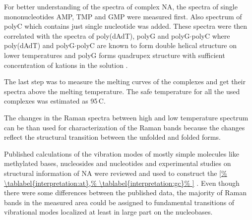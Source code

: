 \begin{table}
	\centering
	
	\caption*{
		(Continued, 3 of 4.)}
\end{table}

\begin{table}
	\centering
	
	\caption*{
		(Continued, 4 of 4.)}
\end{table}

For better understanding of the spectra of complex NA, the spectra of single
mononucleotides AMP, TMP and GMP were measured first. Also spectrum of polyC
which contains just single nucleotide was added. These spectra were then
correlated with the spectra of poly(dAdT), polyG and polyG$\cdot$polyC where
poly(dAdT) and polyG$\cdot$polyC are known to form double helical structure on
lower temperatures
\parencite{Benevides2005}
and polyG forms quadrupex structure with sufficient concentration of kations in
the solution
\parencite{Simard1994}.

The last step was to measure the melting curves of the complexes and get
their spectra above the melting temperature. The safe temperature for all the
used complexes was estimated as 95\,\textdegree{}C.

The changes in the Raman spectra between high and low temperature spectrum
can be than used for characterization of the Raman bands because the changes
reflect the structural transition between the unfolded and folded forms.

Published calculations of the vibration modes of mostly simple molecules like
methylated bases, nucleosides and nucleotides and experimental studies on
structural information of NA were reviewed and used to construct the
\cref{%
	\tablabel{interpretation:at},%
	\tablabel{interpretation:gc}%
}
\parencite{%
	Benevides2005%
}.
Even though there were some differences between the published data, the
majority of Raman bands in the measured area could be assigned to fundamental
transitions of vibrational modes localized at least in large part on the
nucleobases.

